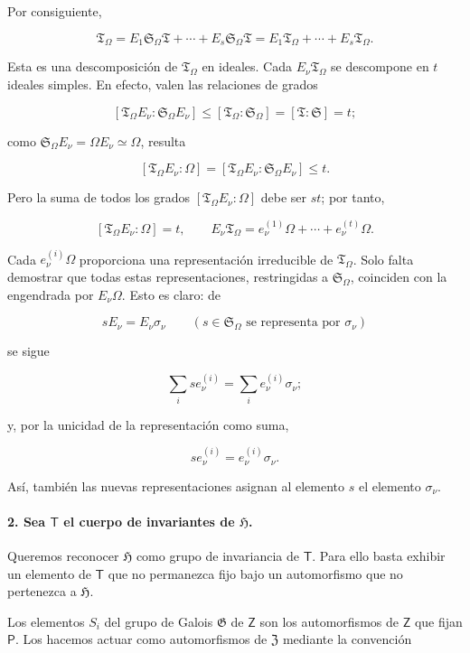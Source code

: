 Por consiguiente,

\[
\mathfrak T_\Omega
=E_1\mathfrak S_\Omega\mathfrak T+\cdots+E_s\mathfrak S_\Omega\mathfrak T
=E_1\mathfrak T_\Omega+\cdots+E_s\mathfrak T_\Omega.
\]

Esta es una descomposición de $\mathfrak T_\Omega$ en ideales. Cada $E_\nu\mathfrak T_\Omega$ se descompone en $t$ ideales simples. En efecto, valen las relaciones de grados

\[
[\mathfrak T_\Omega E_\nu:\mathfrak S_\Omega E_\nu]
\leq[\mathfrak T_\Omega:\mathfrak S_\Omega]
=[\mathfrak T:\mathfrak S]=t;
\]

como $\mathfrak S_\Omega E_\nu=\Omega E_\nu\simeq\Omega$, resulta

\[
[\mathfrak T_\Omega E_\nu:\Omega]
=[\mathfrak T_\Omega E_\nu:\mathfrak S_\Omega E_\nu]\leq t.
\]

Pero la suma de todos los grados $[\mathfrak T_\Omega E_\nu:\Omega]$ debe ser $st$; por tanto,

\[
[\mathfrak T_\Omega E_\nu:\Omega]=t,
\qquad
E_\nu\mathfrak T_\Omega=e_\nu^{(1)}\Omega+\cdots+e_\nu^{(t)}\Omega.
\]

Cada $e_\nu^{(i)}\Omega$ proporciona una representación irreducible de $\mathfrak T_\Omega$. Solo falta demostrar que todas estas representaciones, restringidas a $\mathfrak S_\Omega$, coinciden con la engendrada por $E_\nu\Omega$. Esto es claro: de

\[
sE_\nu=E_\nu\sigma_\nu
\qquad
(s\in\mathfrak S_\Omega\text{ se representa por }\sigma_\nu)
\]

se sigue

\[
\sum_i se_\nu^{(i)}=\sum_i e_\nu^{(i)}\sigma_\nu;
\]

y, por la unicidad de la representación como suma,

\[
se_\nu^{(i)}=e_\nu^{(i)}\sigma_\nu.
\]

Así, también las nuevas representaciones asignan al elemento $s$ el elemento $\sigma_\nu$.

\paragraph{2. Sea $\mathsf T$ el cuerpo de invariantes de $\mathfrak H$.}

Queremos reconocer $\mathfrak H$ como grupo de invariancia de $\mathsf T$. Para ello basta exhibir un elemento de $\mathsf T$ que no permanezca fijo bajo un automorfismo que no pertenezca a $\mathfrak H$.

Los elementos $S_i$ del grupo de Galois $\mathfrak G$ de $\mathsf Z$ son los automorfismos de $\mathsf Z$ que fijan $\mathsf P$. Los hacemos actuar como automorfismos de $\mathfrak Z$ mediante la convención

